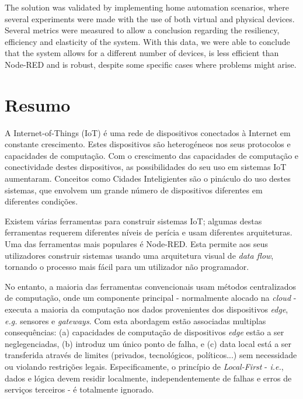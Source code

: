 The solution was validated by implementing home automation scenarios, where several experiments were made with the use of both virtual and physical devices. Several metrics were measured to allow a conclusion regarding the resiliency, efficiency and elasticity of the system. With this data, we were able to conclude that the system allows for a different number of devices, is less efficient than Node-RED and is robust, despite some specific cases where problems might arise.

\vspace*{10mm}\noindent

\chapter*{Resumo}

A Internet-of-Things (IoT) é uma rede de dispositivos conectados à Internet em constante crescimento. Estes dispositivos são heterogéneos nos seus protocolos e capacidades de computação. Com o crescimento das capacidades de computação e conectividade destes dispositivos, as possibilidades do seu uso em sistemas IoT aumentaram. Conceitos como Cidades Inteligientes são o pináculo do uso destes sistemas, que envolvem um grande número de dispositivos diferentes em diferentes condições.

Existem várias ferramentas para construir sistemas IoT; algumas destas ferramentas requerem diferentes níveis de perícia e usam diferentes arquiteturas. Uma das ferramentas mais populares é Node-RED. Esta permite aos seus utilizadores construir sistemas usando uma arquitetura visual de \emph{data flow}, tornando o processo mais fácil para um utilizador não programador.
\par No entanto, a maioria das ferramentas convencionais usam métodos centralizados de computação, onde um componente principal - normalmente alocado na \emph{cloud} - executa a maioria da computação nos dados provenientes dos dispositivos \emph{edge}, \emph{e.g.} sensores e \emph{gateways}. Com esta abordagem estão associadas multiplas consequências: (a) capacidades de computação de dispositivos \emph{edge} estão a ser neglegenciadas, (b) introduz um único ponto de falha, e (c) data local está a ser transferida através de limites (privados, tecnológicos, políticos...) sem necessidade ou violando restrições legais. Especificamente, o princípio de \emph{Local-First} - \emph{i.e.}, dados e lógica devem residir localmente, independentemente de falhas e erros de serviços terceiros - é totalmente ignorado.

